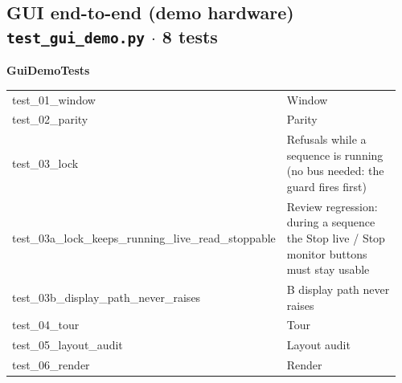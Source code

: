 \subsection{GUI end-to-end (demo hardware) \hfill \normalfont\small\color{soft2}\texttt{test\_gui\_demo.py} $\cdot$ 8 tests}
\par\smallskip \textbf{GuiDemoTests}\par\nopagebreak\smallskip
\begin{longtable}{@{}>{\ttfamily\scriptsize\raggedright\arraybackslash}p{0.40\linewidth} >{\footnotesize\raggedright\arraybackslash}p{0.555\linewidth}@{}}
test\_\allowbreak{}01\_\allowbreak{}window & Window \\
test\_\allowbreak{}02\_\allowbreak{}parity & Parity \\
test\_\allowbreak{}03\_\allowbreak{}lock & Refusals while a sequence is running (no bus needed: the guard fires first) \\
test\_\allowbreak{}03a\_\allowbreak{}lock\_\allowbreak{}keeps\_\allowbreak{}running\_\allowbreak{}live\_\allowbreak{}read\_\allowbreak{}stoppable & Review regression: during a sequence the Stop live / Stop monitor buttons must stay usable \\
test\_\allowbreak{}03b\_\allowbreak{}display\_\allowbreak{}path\_\allowbreak{}never\_\allowbreak{}raises & B display path never raises \\
test\_\allowbreak{}04\_\allowbreak{}tour & Tour \\
test\_\allowbreak{}05\_\allowbreak{}layout\_\allowbreak{}audit & Layout audit \\
test\_\allowbreak{}06\_\allowbreak{}render & Render \\
\end{longtable}
